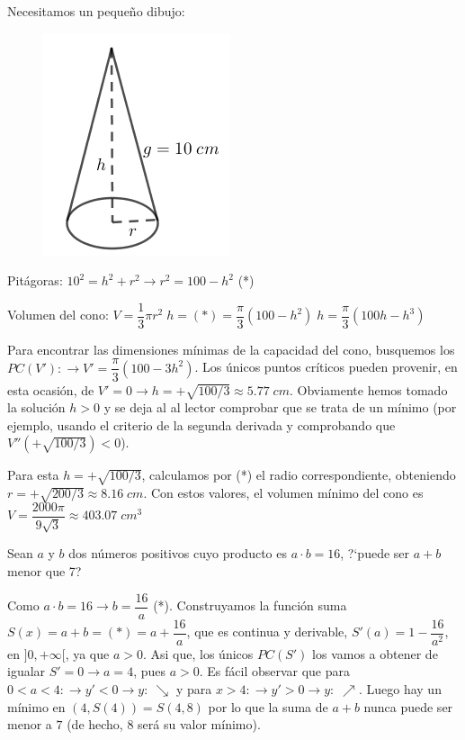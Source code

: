	\begin{proofw}\renewcommand{\qedsymbol}{$\diamond$}
	Necesitamos un pequeño dibujo:
	\begin{multicols}{2}
	\begin{figure}[H]
	\centering
	\includegraphics[width=.2\textwidth]{imagenes/imagenes05/T05IM17.png}
	\end{figure}
	
	\footnotesize{Pitágoras: $10^2=h^2+r^2 \to r^2=100-h^2$ (*)}
	
	\vspace{3mm}
	
	\normalsize{Volumen del cono: $V=\dfrac 1 3 \pi r^2 \; h =(*)= \dfrac \pi 3 (100-h^2)\; h= \dfrac \pi 3 (100h-h^3)$}
		
	\end{multicols}

	Para encontrar las dimensiones mínimas de la capacidad del cono, busquemos los $PC(V'): \to V'=\dfrac \pi 3 (100-3h^2)$. Los únicos puntos críticos pueden provenir, en esta ocasión, de $V'=0 \to h=+\sqrt{100/3} \approx 5.77 \; cm$. Obviamente hemos tomado la solución $h>0$ y se deja al al lector comprobar que se trata de un mínimo (por ejemplo, usando el criterio de la segunda derivada y comprobando que $V''(+\sqrt{100/3})<0$).
	
	Para esta $h=+\sqrt{100/3}$, calculamos por (*) el radio correspondiente, obteniendo $r=+\sqrt{200/3} \approx 8.16\; cm$. Con estos valores, el volumen mínimo del cono es $V=\dfrac {2000\pi}{9\sqrt{3}}\approx 403.07 \; cm^3$
	\end{proofw}
	
	\begin{ejre} Sean $a$ y $b$ dos números positivos cuyo producto es $a\cdot b=16$, ?`puede ser $a+b$ menor que 7?
		
	\end{ejre}
	
	\begin{proofw}\renewcommand{\qedsymbol}{$\diamond$}
	
	Como $a\cdot b=16 \to b=\dfrac {16}{a}$ (*). Construyamos la función suma  $S(x)=a+b=(*)=a+ \dfrac {16}{a}$, que es continua y derivable, $S'(a)=1-\dfrac {16}{a^2}$, en $]0,+\infty[$, ya que $a>0$. Asi que, los únicos $PC(S')$ los vamos a obtener de igualar $S'=0\to a=4$, pues $a>0$. Es fácil observar que para $0<a<4: \to  y'<0 \to y:\ \searrow$  y para $x>4: \to y'>0 \to y:\; \nearrow$. Luego hay un mínimo en $(4,S(4))=S(4,8)$ por lo que la suma de $a+b$ nunca puede ser menor a $7$ (de hecho, $8$ será su valor mínimo).
	
	\end{proofw}
	
